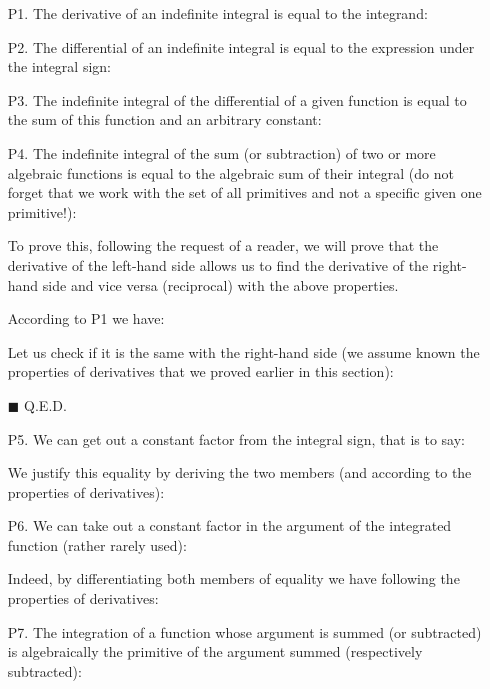 	\begin{enumerate}
		\item[P1.] The derivative of an indefinite integral is equal to the integrand:
		
		\item[P2.] The differential of an indefinite integral is equal to the expression under the integral sign:
		
		\item[P3.] The indefinite integral of the differential of a given function is equal to the sum of this function and an arbitrary constant:
		
		\item[P4.] The indefinite integral of the sum (or subtraction) of two or more algebraic functions is equal to the algebraic sum of their integral (do not forget that we work with the set of all primitives and not a specific given one primitive!):
		
		\begin{dem}
		To prove this, following the request of a reader, we will prove that the derivative of the left-hand side allows us to find the derivative of the right-hand side and vice versa (reciprocal) with the above properties.
		
		According to P1 we have:
				
		Let us check if it is the same with the right-hand side (we assume known the properties of derivatives that we proved earlier in this section):
		
		\end{dem} 
		\begin{flushright}
			$\blacksquare$  Q.E.D.
		\end{flushright}
		\item [P5.] We can get out a constant factor from the integral sign, that is to say:
		
		We justify this equality by deriving the two members (and according to the properties of derivatives):
		
		\item[P6.] We can take out a constant factor in the argument of the integrated function (rather rarely used):
		
		Indeed, by differentiating both members of equality we have following the properties of derivatives:
		
		\item[P7.] The integration of a function whose argument is summed (or subtracted) is algebraically the primitive of the argument summed (respectively subtracted):
		

\end{enumerate}
